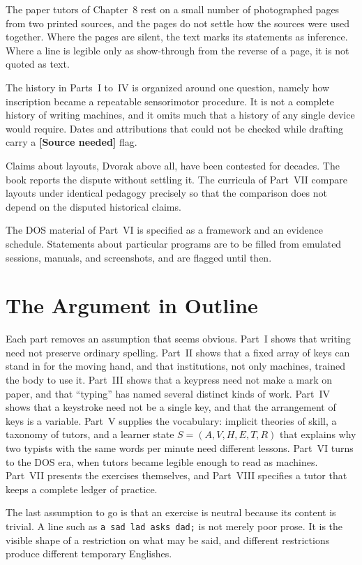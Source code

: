 The paper tutors of Chapter~8 rest on a small number of photographed pages from two printed sources, and the pages do not settle how the sources were used together. Where the pages are silent, the text marks its statements as inference. Where a line is legible only as show-through from the reverse of a page, it is not quoted as text.

The history in Parts~I to~IV is organized around one question, namely how inscription became a repeatable sensorimotor procedure. It is not a complete history of writing machines, and it omits much that a history of any single device would require. Dates and attributions that could not be checked while drafting carry a \textbf{[Source needed]} flag.

Claims about layouts, Dvorak above all, have been contested for decades. The book reports the dispute without settling it. The curricula of Part~VII compare layouts under identical pedagogy precisely so that the comparison does not depend on the disputed historical claims.

The DOS material of Part~VI is specified as a framework and an evidence schedule. Statements about particular programs are to be filled from emulated sessions, manuals, and screenshots, and are flagged until then.

\section*{The Argument in Outline}

Each part removes an assumption that seems obvious. Part~I shows that writing need not preserve ordinary spelling. Part~II shows that a fixed array of keys can stand in for the moving hand, and that institutions, not only machines, trained the body to use it. Part~III shows that a keypress need not make a mark on paper, and that ``typing'' has named several distinct kinds of work. Part~IV shows that a keystroke need not be a single key, and that the arrangement of keys is a variable. Part~V supplies the vocabulary: implicit theories of skill, a taxonomy of tutors, and a learner state $S=(A,V,H,E,T,R)$ that explains why two typists with the same words per minute need different lessons. Part~VI turns to the DOS era, when tutors became legible enough to read as machines. Part~VII presents the exercises themselves, and Part~VIII specifies a tutor that keeps a complete ledger of practice.

The last assumption to go is that an exercise is neutral because its content is trivial. A line such as \texttt{a sad lad asks dad;} is not merely poor prose. It is the visible shape of a restriction on what may be said, and different restrictions produce different temporary Englishes.

